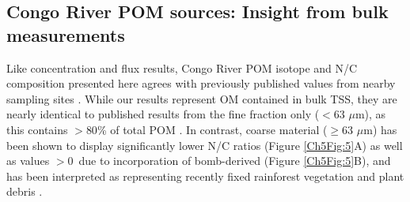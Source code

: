 \subsection{Congo River POM sources: Insight from bulk measurements}

Like concentration and flux results, Congo River POM isotope and N/C composition presented here agrees with previously published values from nearby sampling sites \citep{Mariotti:1991vx,Spencer:2012en,Spencer:2016ho}. While our results represent OM contained in bulk TSS, they are nearly identical to published results from the fine fraction only ($<63$ $\mu$m), as this contains $>80$\% of total POM \citep{Spencer:2012en}. In contrast, coarse material ($\geq63$ $\mu$m) has been shown to display significantly lower N/C ratios (Figure \ref{Ch5Fig:5}A) as well as  values $>0$\textperthousand\ due to incorporation of bomb-derived  (Figure \ref{Ch5Fig:5}B), and has been interpreted as representing recently fixed rainforest vegetation and plant debris \citep{Spencer:2012en}. 

